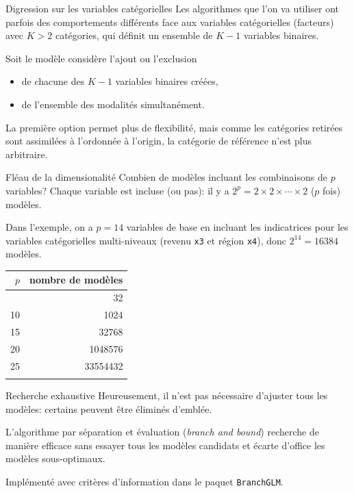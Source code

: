 \documentclass[
  ignorenonframetext,
]{beamer}
\newcounter{none} %
\providecommand{\tightlist}{%
  \setlength{\itemsep}{0pt}\setlength{\parskip}{0pt}}
\begin{document}
\begin{frame}{Digression sur les variables catégorielles}
\protect{}\label{digression-sur-les-variables-catuxe9gorielles}
Les algorithmes que l'on va utiliser ont parfois des comportements
différents face aux variables catégorielles (facteurs) avec \(K > 2\)
catégories, qui définit un ensemble de \(K-1\) variables binaires.

Soit le modèle considère l'ajout ou l'exclusion

\begin{itemize}
\tightlist
\item
  de chacune des \(K-1\) variables binaires créées,
\item
  de l'ensemble des modalités simultanément.
\end{itemize}

La première option permet plus de flexibilité, mais comme les catégories
retirées sont assimilées à l'ordonnée à l'origin, la catégorie de
référence n'est plus arbitraire.
\end{frame}

\begin{frame}[fragile]{Fléau de la dimensionalité}
\protect{}\label{fluxe9au-de-la-dimensionalituxe9}
Combien de modèles incluant les combinaisons de \(p\) variables? Chaque
variable est incluse (ou pas): il y a
\(2^p=2\times 2 \times \cdots \times 2\) (\(p\) fois) modèles.

Dans l'exemple, on a \(p=14\) variables de base en incluant les
indicatrices pour les variables catégorielles multi-niveaux (revenu
\texttt{x3} et région \texttt{x4}), donc \(2^{14} = 16384\) modèles.

{\def\LTcaptype{none} %
\begin{longtable}[]{@{}rr@{}}
\toprule\noalign{}
\(p\) & nombre de modèles \\
\midrule\noalign{}
\endhead
5 & 32 \\
10 & 1024 \\
15 & 32768 \\
20 & 1048576 \\
25 & 33554432 \\
\bottomrule\noalign{}
\end{longtable}
}
\end{frame}

\begin{frame}[fragile]{Recherche exhaustive}
\protect{}\label{recherche-exhaustive}
Heureusement, il n'est pas nécessaire d'ajuster tous les modèles:
certains peuvent être éliminés d'emblée.

L'algorithme par séparation et évaluation (\emph{branch and bound})
recherche de manière efficace sans essayer tous les modèles candidats et
écarte d'office les modèles sous-optimaux.

Implémenté avec critères d'information dans le paquet
\texttt{BranchGLM}.
\end{frame}
\end{document}
